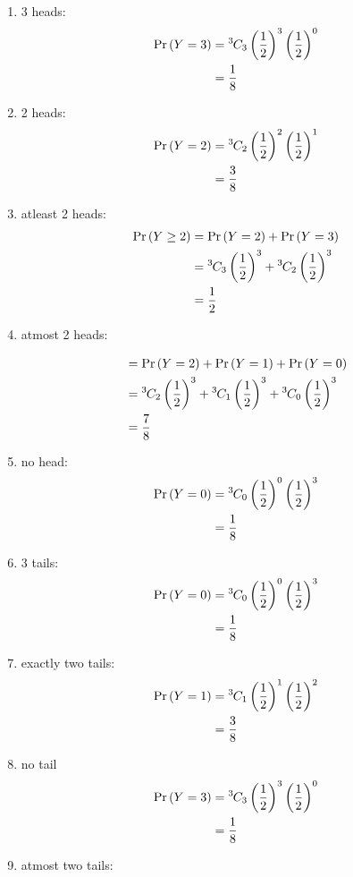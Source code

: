\documentclass[journal,12pt,two column]{IEEEtran}
\begin{document}
\begin{enumerate}[label = (\roman*)]
    \item 3 heads:
    \begin{align}
        \Pr\left(Y = 3\right) &= {{}^{3}\mkern-1muC_{3}} \left(\frac{1}{2}\right)^3 \left(\frac{1}{2}\right)^{0}\\
                   &= \frac{1}{8}
    \end{align}
    \item 2 heads:
    \begin{align}
        \Pr\left(Y = 2\right) &= {{}^{3}\mkern-1muC_{2}} \left(\frac{1}{2}\right)^2 \left(\frac{1}{2}\right)^{1}\\
                   &= \frac{3}{8}
    \end{align}
    \item atleast 2 heads:
    \begin{align}
        \Pr\left(Y \ge 2\right) &= \Pr\left(Y = 2\right) + \Pr\left(Y = 3\right) \\
                   &={{}^{3}\mkern-1muC_{3}} \left(\frac{1}{2}\right)^3 + {{}^{3}\mkern-1muC_{2}} \left(\frac{1}{2}\right)^3 \\
                   &= \frac{1}{2}
    \end{align}
    \item atmost 2 heads:
    
    \begin{align}
         &= \Pr\left(Y = 2\right) + \Pr\left(Y = 1\right) + \Pr\left(Y = 0\right) \\
         &= {{}^{3}\mkern-1muC_{2}} \left(\frac{1}{2}\right)^3 + {{}^{3}\mkern-1muC_{1}} \left(\frac{1}{2}\right)^3 + {{}^{3}\mkern-1muC_{0}} \left(\frac{1}{2}\right)^3\\
         &= \frac{7}{8}
    \end{align}
    \item no head:
    \begin{align}
        \Pr\left(Y = 0\right) &= {{}^{3}\mkern-1muC_{0}} \left(\frac{1}{2}\right)^0 \left(\frac{1}{2}\right)^{3}\\
                   &= \frac{1}{8}
    \end{align}
    \item 3 tails:
    \begin{align}
        \Pr\left(Y = 0\right) &= {{}^{3}\mkern-1muC_{0}} \left(\frac{1}{2}\right)^0 \left(\frac{1}{2}\right)^{3}\\
                   &= \frac{1}{8}
    \end{align}
    \item exactly two tails:
    \begin{align}
        \Pr\left(Y = 1\right) &= {{}^{3}\mkern-1muC_{1}} \left(\frac{1}{2}\right)^1 \left(\frac{1}{2}\right)^{2}\\
                   &= \frac{3}{8}
    \end{align}
    \item no tail
    \begin{align}
        \Pr\left(Y = 3\right) &= {{}^{3}\mkern-1muC_{3}} \left(\frac{1}{2}\right)^3 \left(\frac{1}{2}\right)^{0}\\
                   &= \frac{1}{8}
    \end{align}
    \item atmost two tails:
    

\end{enumerate}
\end{document}
